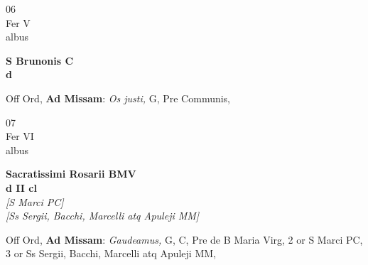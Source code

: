 \documentclass[10pt, openany]{book}
\begin{document}
        \begin{center}
            \begin{minipage}{3.5in}
                \vspace{2em}
                \begin{minipage}{0.5in}
                    {\Huge 06} \\
                    {\normalsize Fer V} \\
                    {\normalsize albus}
                \end{minipage}
                \begin{minipage}{3.0in}
                    \textbf{ \large S Brunonis C \\
                    \textnormal{\normalsize d}} \\ 
                \end{minipage}
                \begin{justify}Off Ord, \textbf{Ad Missam}: \textit{Os justi,} G, Pre Communis,   
                \end{justify}
            \end{minipage}
        \end{center}
    
        \begin{center}
            \begin{minipage}{3.5in}
                \vspace{2em}
                \begin{minipage}{0.5in}
                    {\Huge 07} \\
                    {\normalsize Fer VI} \\
                    {\normalsize albus}
                \end{minipage}
                \begin{minipage}{3.0in}
                    \textbf{ \large Sacratissimi Rosarii BMV \\
                    \textnormal{\normalsize d II cl}} \\ \textit{[S Marci PC]} \\ \textit{[Ss Sergii, Bacchi, Marcelli atq Apuleji MM]} \\ 
                \end{minipage}
                \begin{justify}Off Ord, \textbf{Ad Missam}: \textit{Gaudeamus,} G, C, Pre de B Maria Virg, 2 or S Marci PC, 3 or Ss Sergii, Bacchi, Marcelli atq Apuleji MM,   
                \end{justify}
            \end{minipage}
        \end{center}
    
\end{document}
